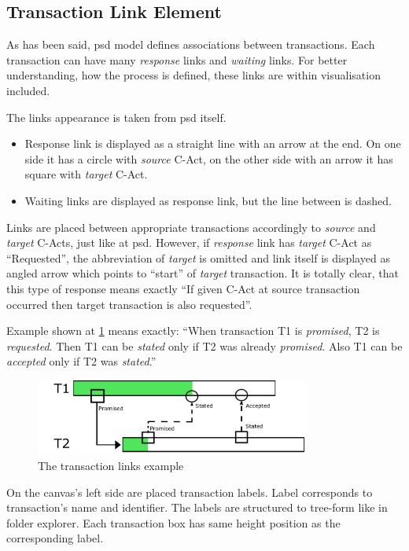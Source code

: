 \subsection{Transaction Link Element}
As has been said, \gls{psd} model defines associations between transactions. Each transaction can have many \textit{response} links and \textit{waiting} links. For better understanding, how the process is defined, these links are within visualisation included. 

The links appearance is taken from \gls{psd} itself. 
\begin{itemize}
\item Response link is displayed as a straight line with an arrow at the end. On one side it has a circle with \textit{source} C-Act, on the other side with an arrow it has square with \textit{target} C-Act.
\item Waiting links are displayed as response link, but the line between is dashed. 
\end{itemize}

Links are placed between appropriate transactions accordingly to \textit{source} and \textit{target} C-Acts, just like at \gls{psd}. However, if \textit{response} link has \textit{target} C-Act as ``Requested'', the abbreviation of \textit{target} is omitted and link itself is displayed as angled arrow which points to ``start'' of \textit{target} transaction. It is totally clear, that this type of response means exactly ``If given C-Act at  source transaction occurred then target transaction is also requested''.

Example shown at \cref{fig:box-state-state} means exactly: ``When transaction T1 is \textit{promised}, T2 is \textit{requested}. Then T1 can be \textit{stated} only if T2 was already \textit{promised}. Also T1 can be \textit{accepted} only if T2 was \textit{stated}.''

\begin{figure}[ht!]
\centering
\includegraphics[width=9cm,keepaspectratio]{img/box-links-example}
\caption{The transaction links example}
\label{fig:box-state-state}
\end{figure}

On the canvas's left side are placed transaction labels. Label corresponds to transaction's name and identifier. The labels are structured to tree-form like in folder explorer. Each transaction box has same height position as the corresponding label. 

